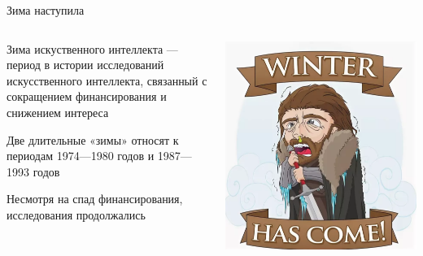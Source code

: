 \documentclass[notes,12pt, aspectratio=169]{beamer}
\newenvironment{wideitemize}{\itemize\addtolength{\itemsep}{10pt}}{\enditemize}
\begin{document}
\begin{frame}{Зима наступила}
\begin{columns}[T]%
	\begin{column}{.7\textwidth}%
		\begin{wideitemize}
			\item \alert{Зима искуственного интеллекта} — период в истории исследований искусственного интеллекта, связанный с сокращением финансирования и  снижением интереса

			\item  Две длительные «зимы» относят к периодам 1974—1980 годов и 1987—1993 годов

			\item Несмотря на спад финансирования, исследования продолжались
		\end{wideitemize}
	\end{column}%
	\hfill%
	\begin{column}{.3\textwidth}%
		\begin{center}
			\includegraphics[width=.99\linewidth]{stark_2.png}
		\end{center}
	\end{column}%
\end{columns}%
\end{frame}
\end{document}
